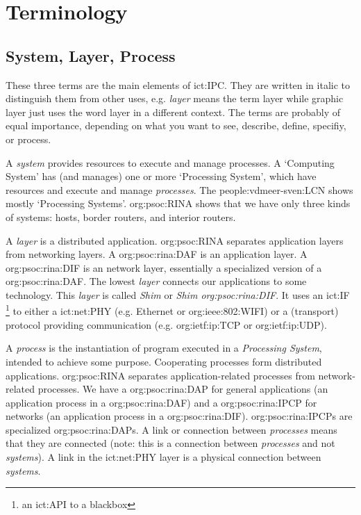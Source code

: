 \section{Terminology}
\label{sec:terminology}


\subsection{System, Layer, Process}

    These three terms are the main elements of \ac{ict:IPC}.
    They are written in italic to distinguish them from other uses, e.g. \textit{layer} means the term layer while graphic layer just uses the word layer in a different context.
    The terms are probably of equal importance, depending on what you want to see, describe, define, specifiy, or process.

    A \textit{system} provides resources to execute and manage processes.
    A `Computing System' has (and manages) one or more `Processing System', which have resources and execute and manage \textit{processes}.
    The \ac{people:vdmeer-sven:LCN} shows mostly `Processing Systems'.
    \acs{org:psoc:RINA} shows that we have only three kinds of systems: hosts, border routers, and interior routers.

    A \textit{layer} is a distributed application.
    \acs{org:psoc:RINA} separates application layers from networking layers.
    A \ac{org:psoc:rina:DAF} is an application layer.
    A \ac{org:psoc:rina:DIF} is an network layer, essentially a specialized version of a \ac{org:psoc:rina:DAF}.
    The lowest \textit{layer} connects our applications to some technology.
    This \textit{layer} is called \textit{Shim} or \textit{Shim \acs{org:psoc:rina:DIF}}.
    It uses an \ac{ict:IF} \footnote{an \ac{ict:API} to a blackbox} to either
        a \ac{ict:net:PHY} (e.g. Ethernet or \acs{org:ieee:802:WIFI}) or
        a (transport) protocol providing communication (e.g. \acs{org:ietf:ip:TCP} or \acs{org:ietf:ip:UDP}).

    A \textit{process} is the instantiation of program executed in a \textit{Processing System}, intended to achieve some purpose.
    Cooperating processes form distributed applications.
    \acs{org:psoc:RINA} separates application-related processes from network-related processes.
    We have a \ac{org:psoc:rina:DAP} for general applications (an application process in a \ac{org:psoc:rina:DAF}) and
        a \ac{org:psoc:rina:IPCP} for networks (an application process in a \ac{org:psoc:rina:DIF}).
    \acp{org:psoc:rina:IPCP} are specialized \acp{org:psoc:rina:DAP}.
    A link or connection between \textit{processes} means that they are connected (note: this is a connection between \textit{processes} and not \textit{systems}).
    A link in the \ac{ict:net:PHY} layer is a physical connection between \textit{systems}.



